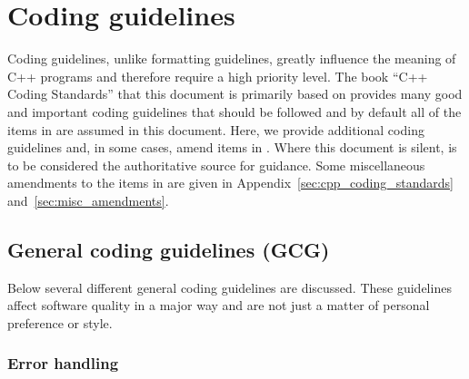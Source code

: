 %
\section{Coding guidelines}
\label{thyracodingguidelines:codingguidelines:sec}
%

Coding guidelines, unlike formatting guidelines, greatly influence the
meaning of C++ programs and therefore require a high priority level.
The book ``C++ Coding Standards'' {}\cite{C++CodingStandards05} that
this document is primarily based on provides many good and important
coding guidelines that should be followed and by default all of the
items in {}\cite{C++CodingStandards05} are assumed in this document.
Here, we provide additional coding guidelines and, in some cases,
amend items in {}\cite{C++CodingStandards05}.  Where this document is
silent, {}\cite{C++CodingStandards05} is to be considered the
authoritative source for guidance.  Some miscellaneous amendments to
the items in {}\cite{C++CodingStandards05} are given in
Appendix~\ref{sec:cpp_coding_standards} and~\ref{sec:misc_amendments}.


%
\subsection{General coding guidelines (GCG)}
%

Below several different general coding guidelines are discussed.  These
guidelines affect software quality in a major way and are not just a matter of
personal preference or style.

%
\subsubsection{Error handling}
%


